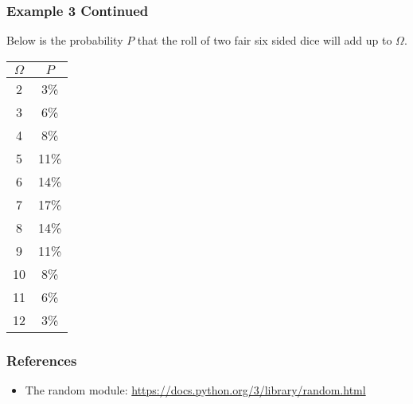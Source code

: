 \documentclass{beamer}
\newcommand{\<}{\langle}
\renewcommand{\>}{\rangle}
\begin{document}
\begin{frame}
\frametitle{Example 3 Continued}

Below is the probability $P$ that the roll of two fair six sided dice will add up to $\Omega$.
\begin{center}
\begin{tabular}{|c|c|}
\hline 
$\Omega$ &	$P$ \\
\hline
2 &	 3\% \\
3 &	 6\% \\
4	&  8\% \\
5 &	 11\% \\
6 &	 14\% \\
7 & 	 17\% \\
8 &	 14\% \\
9 &	 11\% \\
10	 & 8\% \\
11	& 6\% \\ 
12 &	 3\% \\
\hline 
\end{tabular} 
\end{center}
\end{frame}

\begin{frame}
\frametitle{References}

\begin{itemize}
\item The random module: \url{https://docs.python.org/3/library/random.html}
\end{itemize}
\end{frame}
\end{document}

